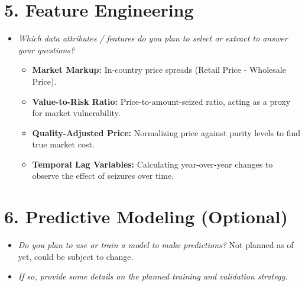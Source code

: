 \documentclass[a4paper,12pt]{article}
\begin{document}
\section{5. Feature Engineering}
\begin{itemize}[leftmargin=1.5em]
    \item \textit{Which data attributes / features do you plan to select
          or extract to answer your questions?}
          \begin{itemize}
              \item \textbf{Market Markup:} In-country price spreads (Retail Price - Wholesale Price).
              \item \textbf{Value-to-Risk Ratio:} Price-to-amount-seized ratio, acting as a proxy for market vulnerability.
              \item \textbf{Quality-Adjusted Price:} Normalizing price against purity levels to find true market cost.
              \item \textbf{Temporal Lag Variables:} Calculating year-over-year changes to observe the effect of seizures over time.
          \end{itemize}
\end{itemize}

\section{6. Predictive Modeling \normalfont\small(Optional)}
\begin{itemize}[leftmargin=1.5em]
    \item \textit{Do you plan to use or train a model to make
          predictions?}
          Not planned as of yet, could be subject to change.

    \item \textit{If so, provide some details on the planned training
          and validation strategy.}
\end{itemize}

\end{document}
